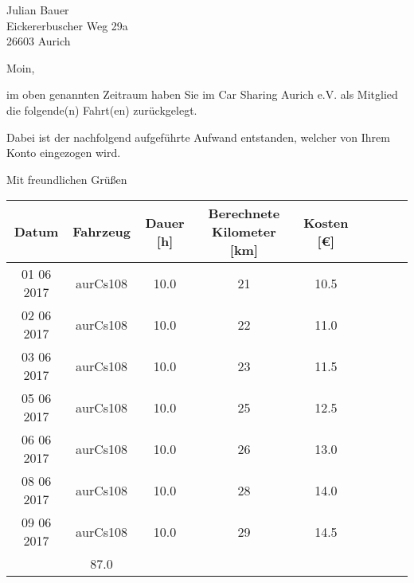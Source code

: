 \documentclass[
	pagenumber=false, %
	parskip=half, %
	fromalign=right, %
	foldmarks=true, %
	addrfield=true %
	firstfoot=on %
    ]{scrlttr2}
\date{ 18 August 2017 } %
\begin{document}
 
\begin{letter}{ Julian Bauer \\ Eickererbuscher Weg 29a\\ 26603 Aurich } %


\opening{Moin,}

im oben genannten Zeitraum haben Sie im Car Sharing Aurich e.V. als Mitglied die folgende(n) Fahrt(en) zurückgelegt.

Dabei ist der nachfolgend aufgeführte Aufwand entstanden, welcher von Ihrem Konto eingezogen wird.

\closing{Mit freundlichen Grüßen}




\end{letter}


\begin{tabular}{ | c | c | c | c | c | c | c | c | c | }
\hline
Datum & Fahrzeug & Dauer [h] & Berechnete Kilometer [km]& Kosten [\euro{}]\\ \hline
01 06 2017&aurCs108&10.0&21&10.5\\\hline
02 06 2017&aurCs108&10.0&22&11.0\\\hline
03 06 2017&aurCs108&10.0&23&11.5\\\hline
05 06 2017&aurCs108&10.0&25&12.5\\\hline
06 06 2017&aurCs108&10.0&26&13.0\\\hline
08 06 2017&aurCs108&10.0&28&14.0\\\hline
09 06 2017&aurCs108&10.0&29&14.5\\
\hhline{|-|-|-|-|=|}
\multicolumn{4}{|r|}{Summe:} &87.0\\\hline
\end{tabular}
\end{document}
